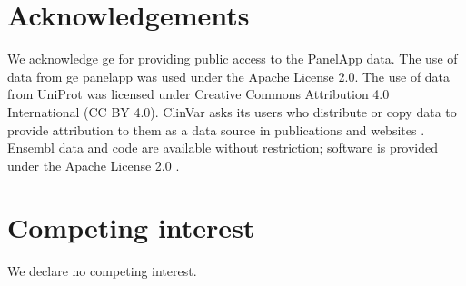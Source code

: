 \section*{Acknowledgements}
\noindent
We acknowledge \ac{ge} for providing public access to the PanelApp data.
The use of data from \ac{ge} panelapp was used under the Apache License 2.0.
The use of data from UniProt was licensed under Creative Commons Attribution 4.0 International (CC BY 4.0).
ClinVar asks its users who distribute or copy data to provide attribution to them as a data source in publications and websites \cite{landrum_clinvar_2018}.
Ensembl data and code are available without restriction; software is provided under the Apache License 2.0 \cite{dyer_ensembl_2025}.

\section*{Competing interest}
\noindent
We declare no competing interest. 



\clearpage

